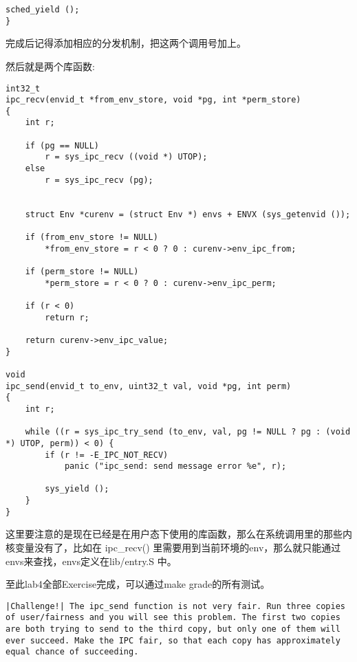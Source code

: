 \documentclass{article}
\newcommand{\funcname}[1]{{\ttfamily \small #1}}
\begin{document}
\begin{CJK*}{UTF8}{gkai}
\begin{lstlisting}[style=ccode, title={\scriptsize \ttfamily \bfseries kern/syscall.c}]
    sched_yield ();
}
\end{lstlisting}

完成后记得添加相应的分发机制，把这两个调用号加上。

\vspace{2em}

然后就是两个库函数:

\begin{lstlisting}[style=ccode, title={\scriptsize \ttfamily \bfseries lib/ipc.c}]
int32_t
ipc_recv(envid_t *from_env_store, void *pg, int *perm_store)
{
    int r;
    
    if (pg == NULL)
        r = sys_ipc_recv ((void *) UTOP);
    else
        r = sys_ipc_recv (pg);


    struct Env *curenv = (struct Env *) envs + ENVX (sys_getenvid ());

    if (from_env_store != NULL)
        *from_env_store = r < 0 ? 0 : curenv->env_ipc_from;

    if (perm_store != NULL)
        *perm_store = r < 0 ? 0 : curenv->env_ipc_perm;

    if (r < 0)
        return r;

	return curenv->env_ipc_value;
}

void
ipc_send(envid_t to_env, uint32_t val, void *pg, int perm)
{
    int r;

    while ((r = sys_ipc_try_send (to_env, val, pg != NULL ? pg : (void *) UTOP, perm)) < 0) {    
        if (r != -E_IPC_NOT_RECV)
            panic ("ipc_send: send message error %e", r);

        sys_yield ();
    }
}
\end{lstlisting}

这里要注意的是现在已经是在用户态下使用的库函数，那么在系统调用里的那些内核变量没有了，比如在 \funcname{ipc\_recv()} 里需要用到当前环境的env，那么就只能通过envs来查找，envs定义在lib/entry.S 中。

\vspace{2em}

至此lab4全部Exercise完成，可以通过make grade的所有测试。


\begin{lstlisting}[style=challenge]
|Challenge!| The ipc_send function is not very fair. Run three copies of user/fairness and you will see this problem. The first two copies are both trying to send to the third copy, but only one of them will ever succeed. Make the IPC fair, so that each copy has approximately equal chance of succeeding.
\end{lstlisting}


\end{CJK*}
\end{document}
